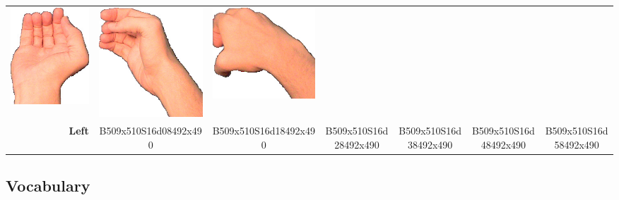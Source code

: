 \documentclass{article}
\begin{document}
\begin{center}
\begin{tabular}{r*{6}{c}}
\includegraphics[scale=0.1]{images/05-14-4.jpg}&
\includegraphics[scale=0.1]{images/05-14-5.jpg}&
\includegraphics[scale=0.1]{images/05-14-6.jpg}\\
\textbf{Left}&
B509x510S16d08492x490&
B509x510S16d18492x490&
B509x510S16d28492x490&
B509x510S16d38492x490&
B509x510S16d48492x490&
B509x510S16d58492x490\\
\end{tabular}
\end{center}

\subsection{Vocabulary}
\end{document}
